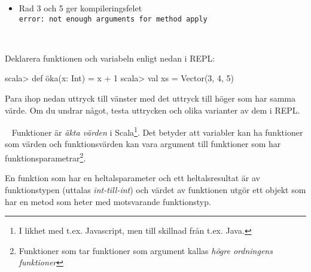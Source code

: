 \SOLUTION

\TaskSolved \what

\begin{itemize}
  \item Rad 3 och 5 ger kompileringsfelet\\
  \texttt{error: not enough arguments for method apply}
\end{itemize}

\QUESTEND




\QUESTBEGIN

\Task  \what~

\noindent Deklarera funktionen  och variabeln  enligt nedan i REPL:
\begin{REPL}
scala> def öka(x: Int) = x + 1
scala> val xs = Vector(3, 4, 5)
\end{REPL}
\noindent Para ihop nedan uttryck till vänster med det uttryck till höger som har samma värde. Om du undrar något, testa uttrycken och olika varianter av dem i REPL.

\begin{ConceptConnections}

\end{ConceptConnections}

\SOLUTION

\TaskSolved \what

\begin{ConceptConnections}
  
\end{ConceptConnections}

\QUESTEND




\QUESTBEGIN

\Task  \what~  Funktioner är \emph{äkta värden} i Scala\footnote{I likhet med t.ex. Javascript, men till skillnad från t.ex. Java.}. Det betyder att variabler kan ha funktioner som värden och funktionsvärden kan vara argument till funktioner som har funktionsparametrar\footnote{Funktioner som tar funktioner som argument kallas \emph{högre ordningens funktioner}}.

  En funktion som har en heltalsparameter och ett heltalsresultat är av funktionstypen  (uttalas \emph{int-till-int}) och värdet av funktionen utgör ett objekt som har en metod som heter  med motsvarande funktionstyp.

